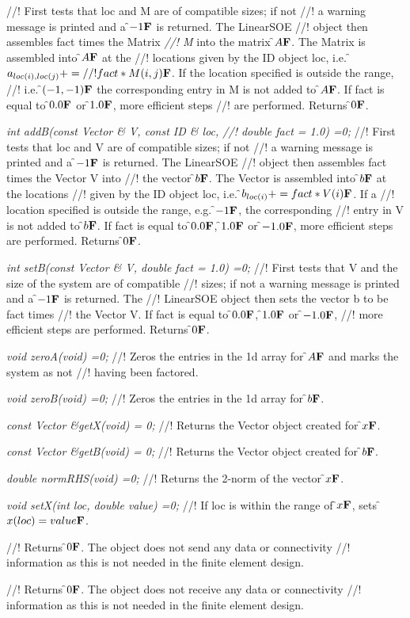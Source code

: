 //! First tests that \p loc and \p M are of compatible sizes; if not
//! a warning message is printed and a \f$-1{\bf F}$ is returned. The LinearSOE
//! object then assembles \p fact times the Matrix {\em 
//! M} into the matrix \f$A{\bf F}$. The Matrix is assembled into \f$A{\bf F}$ at the
//! locations given by the ID object \p loc, i.e. \f$a_{loc(i),loc(j)} +=
//! fact * M(i,j){\bf F}$. If the location specified is outside the range,
//! i.e. \f$(-1,-1){\bf F}$ the corresponding entry in \p M is not added to
\f$A{\bf F}$. If \p fact is equal to \f$0.0{\bf F}$ or \f$1.0{\bf F}$, more efficient steps
//! are performed. Returns \f$0{\bf F}$.


{\em int addB(const Vector \& V, const ID \& loc,
//! double fact = 1.0) =0;}
//! First tests that \p loc and \p V are of compatible sizes; if not
//! a warning message is printed and a \f$-1{\bf F}$ is returned. The LinearSOE
//! object then assembles \p fact times the Vector \p V into
//! the vector \f$b{\bf F}$. The Vector is assembled into \f$b{\bf F}$ at the locations
//! given by the ID object \p loc, i.e. \f$b_{loc(i)} += fact * V(i){\bf F}$. If a
//! location specified is outside the range, e.g. \f$-1{\bf F}$, the corresponding
//! entry in \p V is not added to \f$b{\bf F}$. If \p fact is equal to \f$0.0{\bf F}$,
\f$1.0{\bf F}$ or \f$-1.0{\bf F}$, more efficient steps are performed. Returns \f$0{\bf F}$.


{\em int setB(const Vector \& V, double fact = 1.0) =0;}
//! First tests that \p V and the size of the system are of compatible
//! sizes; if not a warning message is printed and a \f$-1{\bf F}$ is returned. The
//! LinearSOE object then sets the vector \p b to be \p fact times
//! the Vector \p V. If \p fact is equal to \f$0.0{\bf F}$, \f$1.0{\bf F}$ or \f$-1.0{\bf F}$,
//! more efficient steps are performed. Returns \f$0{\bf F}$. 

{\em void zeroA(void) =0;}
//! Zeros the entries in the 1d array for \f$A{\bf F}$ and marks the system as not
//! having been factored.

{\em void zeroB(void) =0;}
//! Zeros the entries in the 1d array for \f$b{\bf F}$.

{\em const Vector \&getX(void) = 0;}
//! Returns the Vector object created for \f$x{\bf F}$.

{\em const Vector \&getB(void) = 0;}
//! Returns the Vector object created for \f$b{\bf F}$.

{\em double normRHS(void) =0;}
//! Returns the 2-norm of the vector \f$x{\bf F}$.

{\em void setX(int loc, double value) =0;}
//! If \p loc is within the range of \f$x{\bf F}$, sets \f$x(loc) = value{\bf F}$.

//! Returns \f$0{\bf F}$. The object does not send any data or connectivity
//! information as this is not needed in the finite element design.

//! Returns \f$0{\bf F}$. The object does not receive any data or connectivity
//! information as this is not needed in the finite element design.

